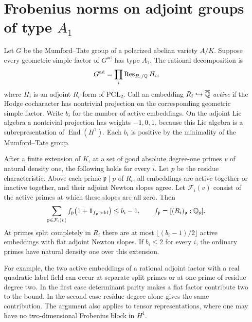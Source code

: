 \section{Frobenius norms on adjoint groups of type \texorpdfstring{\(A_1\)}{A1}}\label{sec:adjoint}

Let \(G\) be the Mumford--Tate group of a polarized abelian variety
\(A/K\). Suppose every geometric simple factor of \(G^{\mathrm{ad}}\)
has type \(A_1\). The rational decomposition is
\[
 G^{\mathrm{ad}}=\prod_i\operatorname{Res}_{R_i/\mathbb Q}H_i,
\]
where \(H_i\) is an adjoint \(R_i\)-form of \(\mathrm{PGL}_2\).
Call an embedding \(R_i\hookrightarrow\overline{\mathbb Q}\) \emph{active} if
the Hodge cocharacter has nontrivial projection on the corresponding
geometric simple factor. Write \(b_i\) for the number of active
embeddings. On the adjoint Lie algebra a nontrivial projection has
weights \(-1,0,1\), because this Lie algebra is a subrepresentation of
\(\operatorname{End}(H^1)\). Each \(b_i\) is positive by the minimality
of the Mumford--Tate group.

\begin{theorem}\label{thm:adjoint}
After a finite extension of \(K\), at a set of good absolute degree-one
primes \(v\) of natural density one, the following holds for every \(i\).
Let \(p\) be the residue characteristic. Above each prime
\(\mathfrak p\mid p\) of \(R_i\), all embeddings are active together
or inactive together, and their adjoint Newton slopes agree. Let
\(\mathcal F_i(v)\) consist of the active primes at which these slopes
are all zero. Then
\[
 \sum_{\mathfrak p\in\mathcal F_i(v)}
 f_{\mathfrak p}\bigl(1+\mathbf 1_{f_{\mathfrak p}\,\mathrm{odd}}\bigr)
 \le b_i-1,
 \qquad f_{\mathfrak p}=[(R_i)_{\mathfrak p}:\mathbb Q_p].
\]
At primes split completely in \(R_i\) there are at most
\(\lfloor(b_i-1)/2\rfloor\) active embeddings with flat adjoint Newton
slopes. If \(b_i\le 2\) for every \(i\), the ordinary primes have
natural density one over this extension.
\end{theorem}

For example, the two active embeddings of a rational adjoint factor
with a real quadratic label field can occur at separate split primes
or at one prime of residue degree two. In the first case determinant
parity makes a flat factor contribute two to the bound. In the second
case residue degree alone gives the same contribution. The argument
also applies to tensor representations, where one may have no
two-dimensional Frobenius block in \(H^1\).

